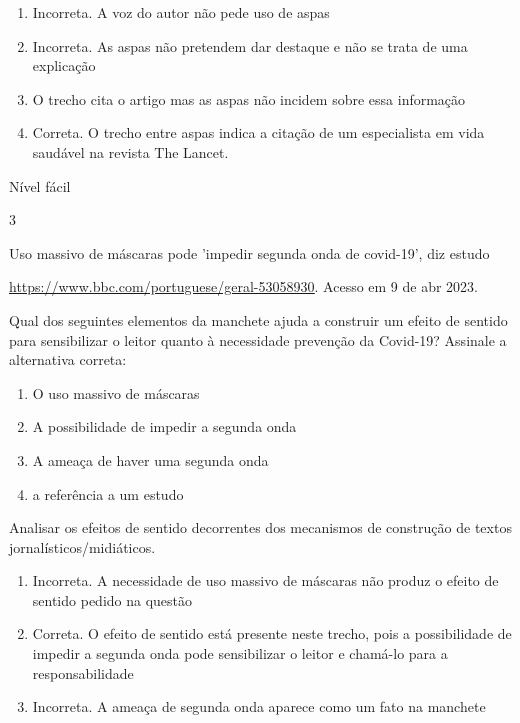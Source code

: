 {\begin{enumerate}
\def\labelenumi{\arabic{enumi}.}
\item
  Incorreta. A voz do autor não pede uso de aspas
\item
  Incorreta. As aspas não pretendem dar destaque e não se trata de uma
  explicação
\item
  O trecho cita o artigo mas as aspas não incidem sobre essa informação
\item
  Correta. O trecho entre aspas indica a citação de um especialista em
  vida saudável na revista The Lancet.
\end{enumerate}

Nível fácil

\num{3}

Uso massivo de máscaras pode 'impedir segunda onda de covid-19', diz
estudo

\href{https://www.bbc.com/portuguese/geral-53058930}{\uline{https://www.bbc.com/portuguese/geral-53058930}}.
Acesso em 9 de abr 2023.

Qual dos seguintes elementos da manchete ajuda a construir um efeito de
sentido para sensibilizar o leitor quanto à necessidade prevenção da
Covid-19? Assinale a alternativa correta:

\begin{enumerate}
\def\labelenumi{\alph{enumi})}
\item
  O uso massivo de máscaras
\item
  A possibilidade de impedir a segunda onda
\item
  A ameaça de haver uma segunda onda
\item
  a referência a um estudo
\end{enumerate}

Analisar os efeitos de sentido decorrentes dos mecanismos de construção
de textos jornalísticos/midiáticos.

\begin{enumerate}
\def\labelenumi{\arabic{enumi}.}
\item
  Incorreta. A necessidade de uso massivo de máscaras não produz o
  efeito de sentido pedido na questão
\item
  Correta. O efeito de sentido está presente neste trecho, pois a
  possibilidade de impedir a segunda onda pode sensibilizar o leitor e
  chamá-lo para a responsabilidade
\item
  Incorreta. A ameaça de segunda onda aparece como um fato na manchete
\end{enumerate}

}
